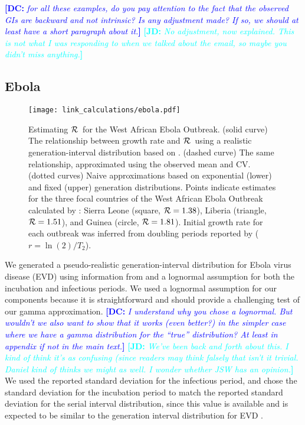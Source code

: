 \documentclass[12pt]{article}
\newcommand{\RR}{\ensuremath{{\cal R}}}
\newcommand{\comment}[3]{\textcolor{#1}{\textbf{[#2: }\textit{#3}\textbf{]}}}
\newcommand{\jd}[1]{\comment{cyan}{JD}{#1}}
\newcommand{\dc}[1]{\comment{blue}{DC}{#1}}
\begin{document}
\dc{for all these examples, do you pay attention to the fact that the observed GIs are \emph{backward} and not intrinsic? Is any adjustment made? If so, we should at least have a short paragraph about it.} \jd{No adjustment, now explained. This is not what I was responding to when we talked about the email, so maybe you didn't miss anything.}

\subsection{Ebola}
\label{EbolaEx}

\begin{figure}[htbp] \centering
	\texttt{[image: link\_calculations/ebola.pdf]}
	\caption{Estimating \RR~for the West African Ebola Outbreak.
(solid curve) The relationship between growth rate and \RR~using a realistic generation-interval distribution based on \cite{AylwBarb14}.
(dashed curve) The same relationship, approximated using the observed mean and CV. 
(dotted curves) Naive approximations based on exponential (lower) and fixed (upper) generation distributions.
Points indicate estimates for the three focal countries of the West African Ebola Outbreak calculated by \cite{AylwBarb14}: {Sierra Leone (square, $\RR=1.38$), Liberia (triangle, $\RR=1.51$), and Guinea (circle, $\RR=1.81$).} Initial growth rate for each outbreak was inferred from doubling periods reported by \cite{AylwBarb14} ($r = \ln(2)/T_2$).
	\label{fig:EbolaCurve}}
\end{figure}

We generated a pseudo-realistic generation-interval distribution for Ebola virus disease (EVD) using information from \cite{AylwBarb14} and a lognormal assumption for both the incubation and infectious periods.
We used a lognormal assumption for our components because it is straightforward and should provide a challenging test of our gamma approximation. 
\dc{I understand why you chose a lognormal. But wouldn't we also want to show that it works (even better?) in the simpler case where we have a gamma distribution for the ``true'' distribution? At least in appendix if not in the main text.}
\jd{We've been back and forth about this. I kind of think it's as confusing (since readers may think falsely that isn't it trivial. Daniel kind of thinks we might as well. I wonder whether JSW has an opinion.}
We used the reported standard deviation for the infectious period, and chose the standard deviation for the incubation period to match the reported standard deviation for the serial interval distribution, since this value is available and is expected to be similar to the generation interval distribution for EVD \cite{AylwBarb14}.
\end{document}
